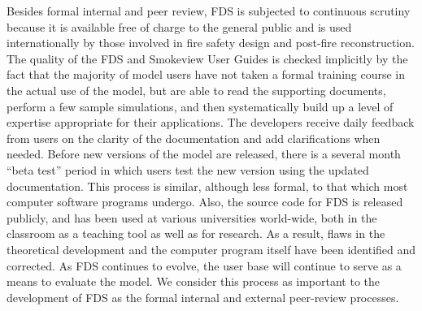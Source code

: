 \documentclass[11pt]{book}
\begin{document}
Besides formal internal and peer review, FDS is subjected to continuous scrutiny because it is available free of charge to the general public and is
used internationally by those involved in fire safety design and post-fire reconstruction. The quality of the FDS and Smokeview User Guides is
checked implicitly by the fact that the majority of model users have not taken a formal training course in the actual use of the model, but are able
to read the supporting documents, perform a few sample simulations, and then systematically build up a level of expertise appropriate for their
applications. The developers receive daily feedback from users on the clarity of the documentation and add clarifications when needed. Before new
versions of the model are released, there is a several month ``beta test'' period in which users test the new version using the updated
documentation. This process is similar, although less formal, to that which most computer software programs undergo. Also, the source code for FDS is
released publicly, and has been used at various universities world-wide, both in the classroom as a teaching tool as well as for research. As a
result, flaws in the theoretical development and the computer program itself have been identified and corrected. As FDS continues to evolve, the user
base will continue to serve as a means to evaluate the model. We consider this process as important to the development of FDS as the formal internal
and external peer-review processes.









\backmatter
\nopart



\printindex
\end{document}
